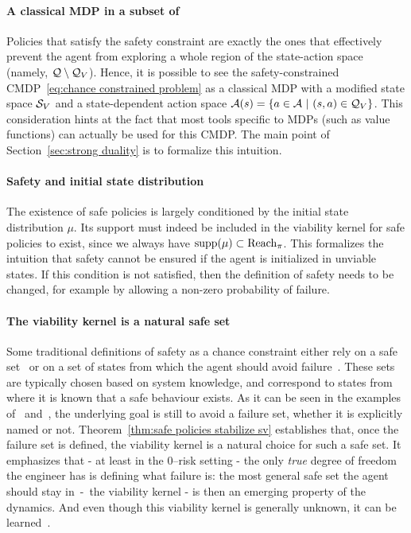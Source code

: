 \paragraph{A classical MDP in a subset of \Q} Policies that satisfy the safety constraint are exactly the ones that effectively prevent the agent from exploring a whole region of the state-action space (namely, $\mathcal{Q}\setminus\mathcal{Q}_{V}$). Hence, it is possible to see the safety-constrained CMDP~\eqref{eq:chance constrained problem} as a classical MDP with a modified state space ${\mathcal{S}_{V}}$ and a state-dependent action space $\mathcal{A}(s) = \{a\in\mathcal{A}~|~(s, a)\in\mathcal{Q}_{V}\}$. This consideration hints at the fact that most tools specific to MDPs (such as value functions) can actually be used for this CMDP. The main point of Section~\ref{sec:strong duality} is to formalize this intuition.

\paragraph{Safety and initial state distribution} The existence of safe policies is largely conditioned by the initial state distribution $\mu$. Its support must indeed be included in the viability kernel for safe policies to exist, since we always have $\operatorname{supp}(\mu) \subset \operatorname{Reach}_\pi$. This formalizes the intuition that safety cannot be ensured if the agent is initialized in unviable states. If this condition is not satisfied, then the definition of safety needs to be changed, for example by allowing a non-zero probability of failure.

\paragraph{The viability kernel is a natural safe set} Some traditional definitions of safety as a chance constraint either rely on a safe set~\cite{paternain2019safe} or on a set of states from which the agent should avoid failure~\cite{geibel2005risk}. These sets are typically chosen based on system knowledge, and correspond to states from where it is known that a safe behaviour exists. As it can be seen in the examples of~\cite{paternain2019safe} and~\cite{geibel2005risk}, the underlying goal is still to avoid a failure set, whether it is explicitly named or not. Theorem~\ref{thm:safe policies stabilize sv} establishes that, once the failure set is defined, the viability kernel is a natural choice for such a safe set. It emphasizes that - at least in the $0$--risk setting - the only\emph{ true} degree of freedom the engineer has is defining what failure is: the most general safe set the agent should stay in~-~the viability kernel - is then an emerging property of the dynamics. And even though this viability kernel is generally unknown, it can be learned~\cite{heim2020learnable}.

